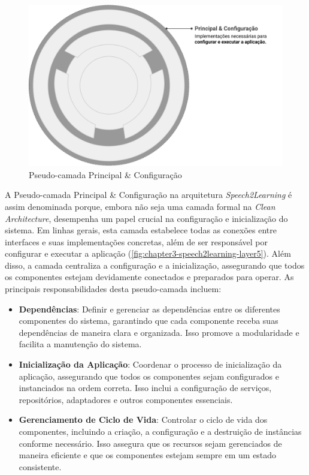 \begin{figure}[htb]
\centering
\caption{Pseudo-camada Principal \& Configuração}
\label{fig:chapter3-speech2learning-layer5}
\includegraphics[width=1\textwidth]{images/chapter3-speech2learning-layer5.png}
\end{figure}

A Pseudo-camada Principal \& Configuração na arquitetura \textit{Speech2Learning} é assim denominada porque, embora não seja uma camada formal na \textit{Clean Architecture}, desempenha um papel crucial na configuração e inicialização do sistema. Em linhas gerais, esta camada estabelece todas as conexões entre interfaces e suas implementações concretas, além de ser responsável por configurar e executar a aplicação (\autoref{fig:chapter3-speech2learning-layer5}). Além disso, a camada centraliza a configuração e a inicialização, assegurando que todos os componentes estejam devidamente conectados e preparados para operar. As principais responsabilidades desta pseudo-camada incluem:

\begin{itemize}
    \item \textbf{Dependências}: Definir e gerenciar as dependências entre os diferentes componentes do sistema, garantindo que cada componente receba suas dependências de maneira clara e organizada. Isso promove a modularidade e facilita a manutenção do sistema.

    \item \textbf{Inicialização da Aplicação}: Coordenar o processo de inicialização da aplicação, assegurando que todos os componentes sejam configurados e instanciados na ordem correta. Isso inclui a configuração de serviços, repositórios, adaptadores e outros componentes essenciais.

    \item \textbf{Gerenciamento de Ciclo de Vida}: Controlar o ciclo de vida dos componentes, incluindo a criação, a configuração e a destruição de instâncias conforme necessário. Isso assegura que os recursos sejam gerenciados de maneira eficiente e que os componentes estejam sempre em um estado consistente.
\end{itemize}

